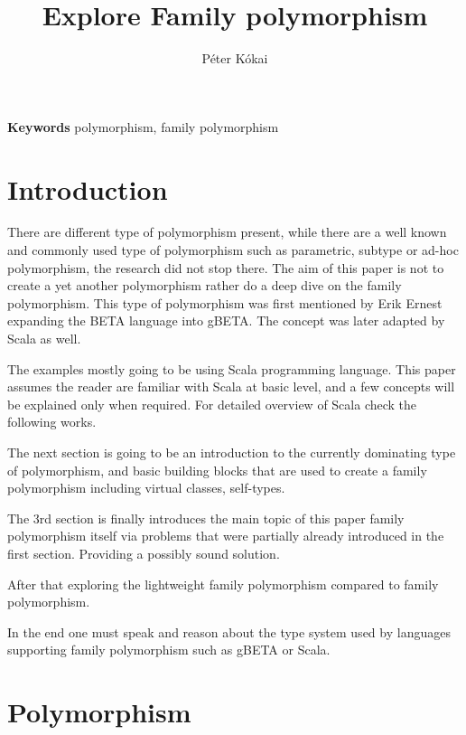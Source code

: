 \documentclass[a4paper, 10pt, conference ]{llncs}
\title{\LARGE \bf
Explore Family polymorphism
}
\author{P\'eter K\'okai}
\institute{E\"ot\"ovs Lor\'and University}
\let\cite\parencite
\begin{document}
\maketitle
\thispagestyle{empty}
\pagestyle{empty}



\small \textbf{Keywords} polymorphism, family polymorphism

\section{Introduction}

There are different type of polymorphism present, while there are a well known and commonly used type of polymorphism such as parametric, subtype or ad-hoc polymorphism, the research did not stop there. The aim of this paper is not to create a yet another polymorphism rather do a deep dive on the family polymorphism. This type of polymorphism was first mentioned by Erik Ernest expanding the BETA language into gBETA. The concept was later adapted by Scala as well.

The examples mostly going to be using Scala programming language. This paper assumes the reader are familiar with Scala at basic level, and a few concepts will be explained only when required. For detailed overview of Scala check the following works\cite{odersky2004overview}\cite{nystrom2004scalable}.

The next section is going to be an introduction to the currently dominating type of polymorphism, and basic building blocks that are used to create a family polymorphism including virtual classes, self-types.

The 3rd section is finally introduces the main topic of this paper family polymorphism itself via problems that were partially already introduced in the first section. Providing a possibly sound solution.

After that exploring the lightweight family polymorphism compared to family polymorphism.

In the end one must speak and reason about the type system used by languages supporting family polymorphism such as gBETA or Scala.

\section{Polymorphism}
\end{document}
